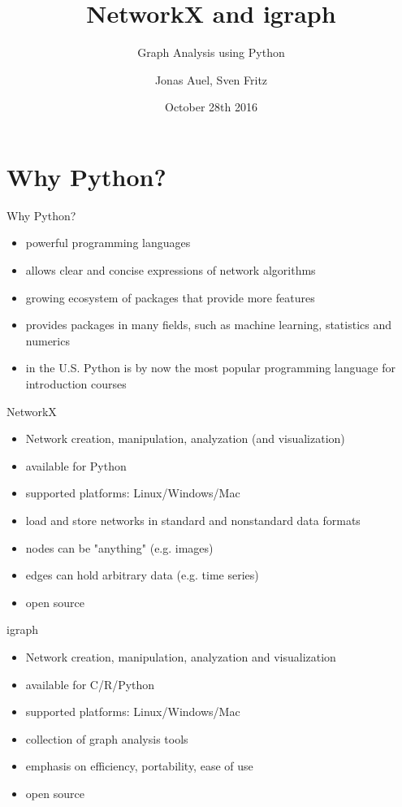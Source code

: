 \documentclass[12pt]{beamer}
\author{Jonas Auel, Sven Fritz}
\title{NetworkX and igraph}
\subtitle{Graph Analysis using Python}
\institute{Uni Mannheim}
\date{October 28th 2016}
\begin{document}
	\maketitle
	\section{Why Python?}
	\begin{frame}{Why Python?}
		\begin{itemize}
			\item powerful programming languages
			\item allows clear and concise expressions of network algorithms
			\item growing ecosystem of packages that provide more features
			\item provides packages in many fields, such as machine learning, statistics and numerics
			\item in the U.S. Python is by now the most popular programming language for introduction courses
		\end{itemize}
	\end{frame}
	\begin{frame}{NetworkX}
		\begin{itemize}
			\item Network creation, manipulation, analyzation (and visualization)
			\item available for Python
			\item supported platforms: Linux/Windows/Mac
			\item load and store networks in standard and nonstandard data formats
			\item nodes can be "anything" (e.g. images)
			\item edges can hold arbitrary data (e.g. time series)
			\item open source
		\end{itemize}
	\end{frame}
	\begin{frame}{igraph}
		\begin{itemize}
			\item Network creation, manipulation, analyzation and visualization
			\item available for C/R/Python
			\item supported platforms: Linux/Windows/Mac 
			\item collection of graph analysis tools
			\item emphasis on efficiency, portability, ease of use
			\item open source
		\end{itemize}
	\end{frame}
\end{document}
